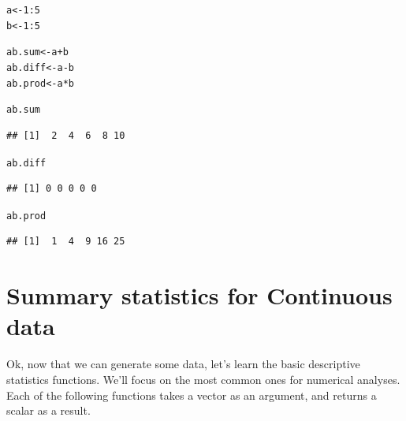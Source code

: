 \documentclass{tufte-book}\usepackage[]{graphicx}\usepackage[]{color}
\makeatletter
\newcommand{\hlnum}[1]{\textcolor[rgb]{0.686,0.059,0.569}{#1}}%
\newcommand{\hlopt}[1]{\textcolor[rgb]{0,0,0}{#1}}%
\newcommand{\hlstd}[1]{\textcolor[rgb]{0.345,0.345,0.345}{#1}}%
\newcommand{\hlkwb}[1]{\textcolor[rgb]{0.69,0.353,0.396}{#1}}%
\newenvironment{kframe}{%
 \def\at@end@of@kframe{}%
 \ifinner\ifhmode%
  \def\at@end@of@kframe{\end{minipage}}%
  \begin{minipage}{\columnwidth}%
 \fi\fi%
 \def\FrameCommand##1{\hskip\@totalleftmargin \hskip-\fboxsep
 \colorbox{shadecolor}{##1}\hskip-\fboxsep
     \hskip-\linewidth \hskip-\@totalleftmargin \hskip\columnwidth}%
 \MakeFramed {\advance\hsize-\width
   \@totalleftmargin\z@ \linewidth\hsize
   \@setminipage}}%
 {\par\unskip\endMakeFramed%
 \at@end@of@kframe}
\newenvironment{knitrout}{}{} %
\makeatother
\begin{document}
\begin{knitrout}
\color{fgcolor}\begin{kframe}
\begin{alltt}
\hlstd{a} \hlkwb{<-} \hlnum{1}\hlopt{:}\hlnum{5}
\hlstd{b} \hlkwb{<-} \hlnum{1}\hlopt{:}\hlnum{5}

\hlstd{ab.sum} \hlkwb{<-} \hlstd{a} \hlopt{+} \hlstd{b}
\hlstd{ab.diff} \hlkwb{<-} \hlstd{a} \hlopt{-} \hlstd{b}
\hlstd{ab.prod} \hlkwb{<-} \hlstd{a} \hlopt{*} \hlstd{b}

\hlstd{ab.sum}
\end{alltt}
\begin{verbatim}
## [1]  2  4  6  8 10
\end{verbatim}
\begin{alltt}
\hlstd{ab.diff}
\end{alltt}
\begin{verbatim}
## [1] 0 0 0 0 0
\end{verbatim}
\begin{alltt}
\hlstd{ab.prod}
\end{alltt}
\begin{verbatim}
## [1]  1  4  9 16 25
\end{verbatim}
\end{kframe}
\end{knitrout}

\section{Summary statistics for Continuous data}

Ok, now that we can generate some data, let's learn the basic descriptive statistics functions. We'll focus on the most common ones for numerical analyses. Each of the following functions takes a vector as an argument, and returns a scalar as a result.
\end{document}
